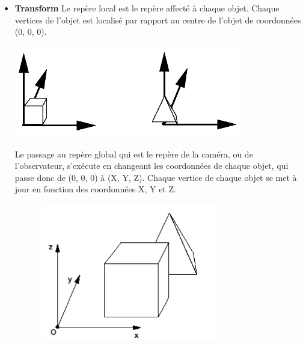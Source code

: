\begin{itemize}
  \item{\textbf{Transform}}
Le repère local est le repère affecté à chaque objet. Chaque vertices de l’objet est localisé par rapport au centre de l’objet de coordonnées (0, 0, 0).
\\
\begin{center}
\includegraphics[width=10cm,height=40mm]{leo/images/repereLocal.png}
\end{center}

Le passage au repère global qui est le repère de la caméra, ou de l’observateur, s’exécute en changeant les coordonnées de chaque objet, qui passe donc de (0, 0, 0) à (X, Y, Z). Chaque vertice de chaque objet se met à jour en fonction des coordonnées X, Y et Z.
\\
\begin{center}
\includegraphics[width=10cm,height=60mm]{leo/images/repereGlobal.png}\\
\end{center}


\end{itemize}
